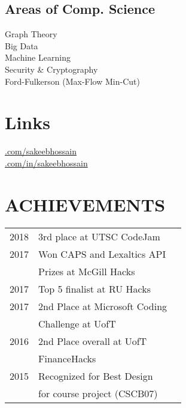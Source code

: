 \documentclass[]{deedy-resume-openfont}
\begin{document}
\begin{minipage}[t]{0.33\textwidth}
\subsection{Areas of Comp. Science}
Graph Theory \\
Big Data\\
Machine Learning \\
Security \& Cryptography \\
Ford-Fulkerson (Max-Flow Min-Cut)
\sectionsep


\section{Links} 
\href{https://github.com/sakeebhossain}{.com/sakeebhossain} \\
\href{https://www.linkedin.com/in/sakeebhossain}{.com/in/sakeebhossain} \\
\sectionsep


\section{ACHIEVEMENTS} 
\begin{tabular}{rll}
2018	     & 3rd place at UTSC CodeJam\\
2017	     & Won CAPS and Lexaltics API\\
             & Prizes at McGill Hacks\\
2017	     & Top 5 finalist at RU Hacks\\
2017	     & 2nd Place at Microsoft Coding\\
             & Challenge at UofT\\
2016	     & 2nd Place overall at UofT\\ 
             & FinanceHacks\\
2015	     & Recognized for Best Design\\
             & for course project (CSCB07)\\

\end{tabular}
\sectionsep


%
%

\end{minipage} 
\end{document}
